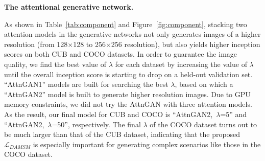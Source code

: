 \textbf{The attentional generative network. }{ As shown in Table~\ref{tab:component} and Figure~\ref{fig:component}, stacking two attention models in the generative networks not only generates images of a higher resolution (from 128$\times$128 to 256$\times$256 resolution), but also yields higher inception scores on both CUB and COCO datasets. In order to guarantee the image quality, we find the best value of $\lambda$ for each dataset by increasing the value of $\lambda$ until the overall inception score is starting to drop on a held-out validation set. ``AttnGAN1'' models are built for searching the best $\lambda$, based on which a ``AttnGAN2'' model is built to generate higher resolution images. Due to GPU memory constraints, we did not try the AttnGAN with three attention models. As the result, our final model for CUB and COCO is ``AttnGAN2,~$\lambda$=5'' and ``AttnGAN2,~$\lambda$=50'', respectively. The final $\lambda$ of the COCO dataset turns out to be much larger than that of the CUB dataset, indicating that the proposed $\mathcal{L}_{DAMSM}$ is especially important for generating complex scenarios like those in the COCO dataset. 

}
